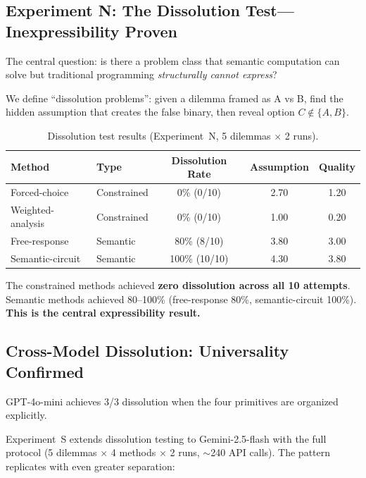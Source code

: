 \documentclass[11pt,a4paper]{article}
\begin{document}
\subsection{Experiment N: The Dissolution Test---Inexpressibility Proven}
\label{sec:dissolution}

The central question: is there a problem class that semantic computation can solve but traditional programming \emph{structurally cannot express}?

We define ``dissolution problems'': given a dilemma framed as A vs B, find the hidden assumption that creates the false binary, then reveal option $C \notin \{A, B\}$.

\begin{table}[H]
\centering
\caption{Dissolution test results (Experiment~N, 5 dilemmas $\times$ 2 runs).}
\begin{tabular}{llccc}
\toprule
\textbf{Method} & \textbf{Type} & \textbf{Dissolution Rate} & \textbf{Assumption} & \textbf{Quality} \\
\midrule
Forced-choice     & Constrained & 0\% (0/10) & 2.70 & 1.20 \\
Weighted-analysis & Constrained & 0\% (0/10) & 1.00 & 0.20 \\
Free-response     & Semantic    & 80\% (8/10) & 3.80 & 3.00 \\
Semantic-circuit  & Semantic    & 100\% (10/10) & 4.30 & 3.80 \\
\bottomrule
\end{tabular}
\label{tab:dissolution}
\end{table}

The constrained methods achieved \textbf{zero dissolution across all 10 attempts}. Semantic methods achieved 80--100\% (free-response 80\%, semantic-circuit 100\%). \textbf{This is the central expressibility result.}

\subsection{Cross-Model Dissolution: Universality Confirmed}
\label{sec:cross-model-dissolution}

GPT-4o-mini achieves 3/3 dissolution when the four primitives are organized explicitly.

Experiment~S extends dissolution testing to Gemini-2.5-flash with the full protocol (5 dilemmas $\times$ 4 methods $\times$ 2 runs, $\sim$240 API calls). The pattern replicates with even greater separation:
\end{document}
